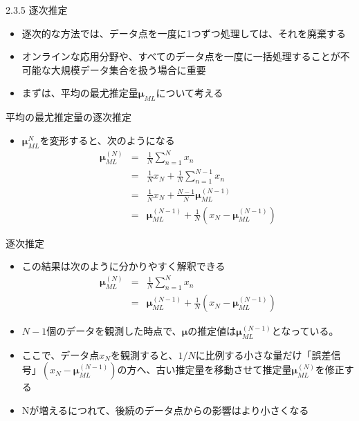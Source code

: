 \begin{frame}{2.3.5 逐次推定}
 \begin{itemize}
  \item 逐次的な方法では、データ点を一度に1つずつ処理しては、それを廃棄する
  \item オンラインな応用分野や、すべてのデータ点を一度に一括処理することが不可能な大規模データ集合を扱う場合に重要
  \item まずは、平均の最尤推定量$\bm{\mu}_{ML}$について考える
 \end{itemize}
\end{frame}

\begin{frame}{平均の最尤推定量の逐次推定}
 \begin{itemize}
  \item $\bm{\mu}_{ML}^{N}$を変形すると、次のようになる
        \begin{eqnarray}
         \bm{\mu}_{ML}^{(N)} &= &\frac{1}{N}\sum_{n=1}^{N}x_n \nonumber \\
         & =& \frac{1}{N}x_N+\frac{1}{N}\sum_{n=1}^{N-1}x_n \nonumber \\
         & =& \frac{1}{N}x_N + \frac{N-1}{N}\bm{\mu}_{ML}^{(N-1)}\nonumber \\
         & =& \bm{\mu}_{ML}^{(N-1)} +\frac{1}{N} (x_N-\bm{\mu}_{ML}^{(N-1)})\label{162008_21Nov14}
        \end{eqnarray}
 \end{itemize}
\end{frame}

\begin{frame}{逐次推定}
 \begin{itemize}
  \item この結果は次のように分かりやすく解釈できる
        \begin{eqnarray}
         \bm{\mu}_{ML}^{(N)} &= &\frac{1}{N}\sum_{n=1}^{N}x_n \\
         & =& \bm{\mu}_{ML}^{(N-1)} +\frac{1}{N} (x_N-\bm{\mu}_{ML}^{(N-1)})
        \end{eqnarray}
  \item $N-1$個のデータを観測した時点で、$\bm{\mu}$の推定値は$\bm{\mu}_{ML}^{(N-1)}$となっている。
  \item ここで、データ点$x_N$を観測すると、$1/N$に比例する小さな量だけ「誤差信号」$(x_N-\bm{\mu}_{ML}^{(N-1)})$の方へ、古い推定量を移動させて推定量$\bm{\mu}_{ML}^{(N)}$を修正する
  \item Nが増えるにつれて、後続のデータ点からの影響はより小さくなる
 \end{itemize}
\end{frame}

